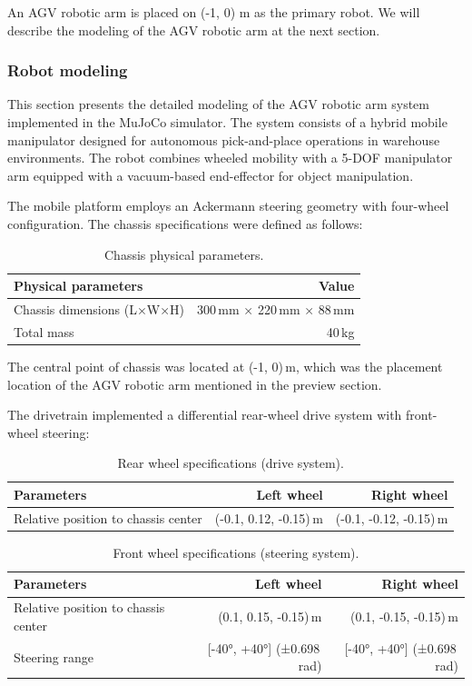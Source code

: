 \documentclass[english, 12pt, a4paper, elec, utf8, a-2b, online]{aaltothesis}
\begin{document}
An AGV robotic arm is placed on (-1, 0) m as the primary robot. We will describe the modeling of the AGV robotic arm at the next section.

\subsubsection{Robot modeling}

This section presents the detailed modeling of the AGV robotic arm system implemented in the MuJoCo simulator. The system consists of a hybrid mobile manipulator designed for autonomous pick-and-place operations in warehouse environments. The robot combines wheeled mobility with a 5-DOF manipulator arm equipped with a vacuum-based end-effector for object manipulation.

The mobile platform employs an Ackermann steering geometry with four-wheel configuration. The chassis specifications were defined as follows:

\begin{table}[h]
\centering
\begin{tabular}{l|r}
Physical parameters & Value \\\hline
Chassis dimensions (L×W×H) & 300\,mm × 220\,mm × 88\,mm \\
Total mass & 40\,kg
\end{tabular}
\caption{\label{tab:widgets}Chassis physical parameters.}
\end{table}

The central point of chassis was located at (-1, 0)\,m, which was the placement location of the AGV robotic arm mentioned in the preview section.

The drivetrain implemented a differential rear-wheel drive system with front-wheel steering:

\begin{table}[h]
\centering
\begin{tabular}{l|r|r}
Parameters & Left wheel & Right wheel \\\hline
Relative position to chassis center & (-0.1, 0.12, -0.15)\,m &  (-0.1, -0.12, -0.15)\,m \\
\end{tabular}
\caption{\label{tab:widgets}Rear wheel specifications (drive system).}
\end{table}

\begin{table}[H]
\centering
\begin{tabular}{l|r|r}
Parameters & Left wheel & Right wheel \\\hline
Relative position to chassis center & 	(0.1, 0.15, -0.15)\,m &  (0.1, -0.15, -0.15)\,m \\
Steering range & [-40°, +40°] (±0.698\,rad) & [-40°, +40°] (±0.698\,rad)  \\
\end{tabular}
\caption{\label{tab:widgets}Front wheel specifications (steering system).}
\end{table}
\end{document}
